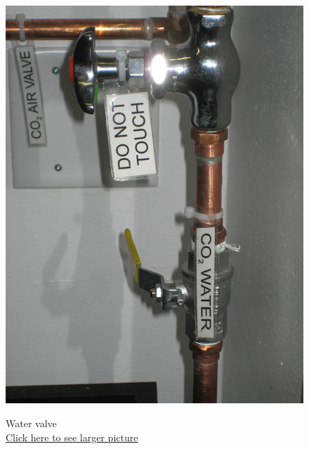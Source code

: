\documentclass{../lab}
\begin{document}
\begin{figure}[H]
  \href{http://experimentationlab.berkeley.edu/sites/default/files/CO-2/CO2_H2O_3529B.jpg}{\includegraphics[width=\linewidth,keepaspectratio]{images/CO2_H2O_3529B.jpg}}
  \caption{Water valve \\ \href{http://experimentationlab.berkeley.edu/sites/default/files/CO-2/CO2_H2O_3529B.jpg}{Click here to see larger picture}}\label{fig:WaterValve}
\endminipage
\end{figure}
\end{document}
